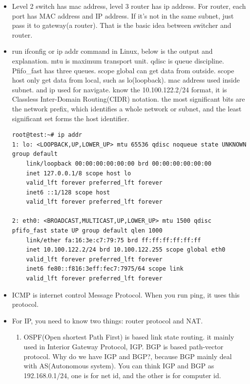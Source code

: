 \documentclass[a4paper,11pt,twoside]{book}
\begin{document}
\begin{itemize}
	\item Level 2 switch has mac address, level 3 router has ip address. For router, each port has MAC address and IP address. If it's not in the same subnet, just pass it to gateway(a router). That is the basic idea between switcher and router. 
	
	\item run ifconfig or ip addr command in Linux, below is the output and explanation. mtu is maximum transport unit. qdisc is queue discipline.  Pfifo\_fast has three queues. scope global can get data from outside. scope host only get data from local, such as lo(loopback).  mac address used inside subnet. and ip used for navigate.  know the 10.100.122.2/24 format, it is Classless Inter-Domain Routing(CIDR) notation. the most significant bits are the network prefix, which identifies a whole network or subnet, and the least significant set forms the host identifier.
\begin{lstlisting}
root@test:~# ip addr
1: lo: <LOOPBACK,UP,LOWER_UP> mtu 65536 qdisc noqueue state UNKNOWN group default
	link/loopback 00:00:00:00:00:00 brd 00:00:00:00:00:00
	inet 127.0.0.1/8 scope host lo
	valid_lft forever preferred_lft forever
	inet6 ::1/128 scope host
	valid_lft forever preferred_lft forever

2: eth0: <BROADCAST,MULTICAST,UP,LOWER_UP> mtu 1500 qdisc pfifo_fast state UP group default qlen 1000
	link/ether fa:16:3e:c7:79:75 brd ff:ff:ff:ff:ff:ff
	inet 10.100.122.2/24 brd 10.100.122.255 scope global eth0
	valid_lft forever preferred_lft forever
	inet6 fe80::f816:3eff:fec7:7975/64 scope link
	valid_lft forever preferred_lft forever
\end{lstlisting}


\item  ICMP is internet control Message Protocol. When you run ping, it uses this protocol. 

\item  For IP, you need to know two things: router protocol and NAT.
\begin{enumerate}
	\item OSPF(Open shortest Path First) is based link state routing.  it mainly used in Interior Gateway Protocol, IGP.  BGP is based path-vector protocol. Why do we have IGP and BGP?, because BGP mainly deal with AS(Autonomous system). You can think IGP and BGP as 192.168.0.1/24, one is for net id, and the other is for computer id. 
	

\end{enumerate}
\end{itemize}
\end{document}
